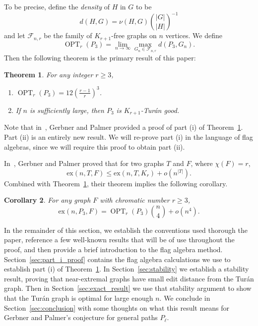 \documentclass[12pt]{article}
\newtheorem{thm}{Theorem}[section]
\newtheorem{cor}[thm]{Corollary}
\newcommand{\ext}{\text{ex}}
\DeclareMathOperator{\OPT}{OPT}
\begin{document}
To be precise,  define the \emph{density} of $H$ in $G$ to be
\[ d(H,G) = \nu(H,G) \binom{|G|}{|H|}^{-1} \]
and let $\mathcal{F}_{n,r}$ be the family of $K_{r+1}$-free graphs on $n$
vertices. We define
\[ \OPT_r(P_3) = \lim\limits_{n \to \infty} \max_{G_n \in \mathcal{F}_{n,r}} d(P_3,G_n).\]
Then the following theorem is the primary result of this paper:

\begin{thm}\label{main_p4_thm}
For any integer $r \geq 3$,
\begin{enumerate}
    \item[ (i) ] $\OPT_r(P_3) = 12\left(\frac{r-1}{r}\right)^3$.
    \item[ (ii) ] If $n$ is sufficiently large, then $P_3$ is $K_{r+1}$-Tur\'{a}n
good.
\end{enumerate}
\end{thm}

Note that in~\cite{GerbnerPalmer2020}, Gerbner and Palmer provided a proof of
part (i) of Theorem~\ref{main_p4_thm}. Part (ii) is an entirely new result. We will
re-prove part (i) in the language of flag algebras, since we will require this
proof to obtain part (ii).

In~\cite{GERBNER2019103001}, Gerbner and Palmer proved that for two graphs $T$ and $F$, where $\chi(F) = r$, 
\[ \ext(n,T,F) \leq \ext(n,T,K_r) + o(n^{|T|}).\]
Combined with Theorem~\ref{main_p4_thm}, their theorem implies the following corollary.

\begin{cor}
For any graph $F$ with chromatic number $r \geq 3$, 
\[ \ext(n,P_3,F) = \OPT_r(P_3)\binom{n}{4} + o(n^4).\]
\end{cor}

In the remainder of this section, we establish the conventions used
thorough the paper, reference a few well-known results that
will be of use throughout the proof, and then provide a brief introduction to the
flag algebra method. Section~\ref{sec:part_i_proof} contains the flag algebra
calculations we use to establish part (i) of Theorem~\ref{main_p4_thm}. In
Section~\ref{sec:stability} we establish a stability result, proving that
near-extremal graphs have small edit distance from the Tur\'an graph. Then in
Section~\ref{sec:exact_result} we use that stability argument to show that the
Tur\'an graph is optimal for large enough $n$. We conclude in
Section~\ref{sec:conclusion} with some thoughts on what this result means for
Gerbner and Palmer's conjecture for general paths $P_\ell$.
\end{document}
